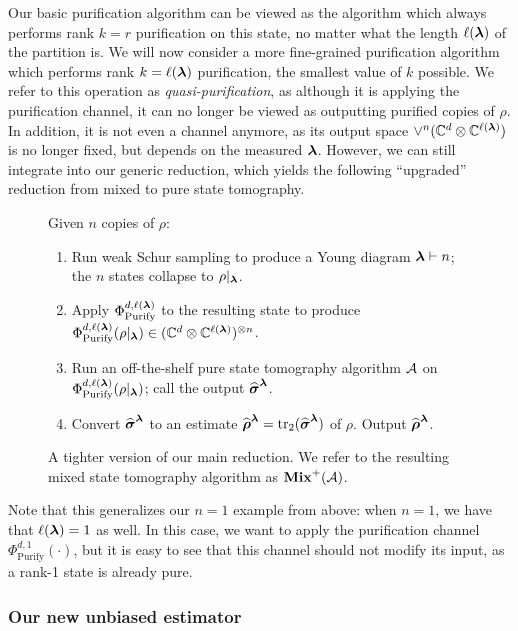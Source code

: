 \documentclass{article}
\newcommand{\mixed}{\textup{\textbf{Mix}}}
\newcommand{\purifychan}{\Phi_{\mathrm{Purify}}}
\begin{document}
Our basic purification algorithm  can be viewed as the algorithm which always performs rank $k = r$ purification on this state, no matter what the length $\ell(\boldsymbol{\lambda})$ of the partition is.
We will now consider 
a more fine-grained purification algorithm which performs rank $k = \ell(\boldsymbol{\lambda})$ purification, the smallest value of $k$ possible.
We refer to this operation as \emph{quasi-purification},
as although it is applying the purification channel,
it can no longer be viewed as outputting purified copies of $\rho$.
In addition, it is not even a channel anymore,
as its output space $\lor^n (\mathbb C^d \otimes \mathbb C^{\ell(\boldsymbol{\lambda})})$ 
is no longer fixed, but depends on the measured $\boldsymbol{\lambda}$.
However, we can still integrate into our generic reduction,
which yields the following ``upgraded'' reduction from mixed to pure state tomography.

{
\begin{figure}[H]
Given $n$ copies of $\rho$:
\begin{enumerate}
    \item Run weak Schur sampling to produce a Young diagram $\boldsymbol{\lambda} \vdash n$; the $n$ states collapse to $\rho|_{\boldsymbol{\lambda}}$. 
    \item Apply $\purifychan^{d, \ell(\blambda)}$ to the resulting state to produce $\purifychan^{d, \ell(\blambda)}(\rho|_{\blambda}) \in (\C^d \otimes \C^{\ell(\blambda)})^{\otimes n}$.
    \item Run an off-the-shelf pure state tomography algorithm $\mathcal{A}$ on $\purifychan^{d, \ell(\blambda)}(\rho|_{\blambda})$; call the output $\widehat{\boldsymbol{\sigma}}^{\boldsymbol{\lambda}}$.
    \item Convert $\widehat{\boldsymbol{\sigma}}^{\boldsymbol{\lambda}}$ to an estimate $\widehat{\boldsymbol{\rho}}^{\boldsymbol{\lambda}} = \tr_2(\widehat{\boldsymbol{\sigma}}^{\boldsymbol{\lambda}})$ of $\rho$. Output $\widehat{\boldsymbol{\rho}}^{\boldsymbol{\lambda}}$.
\end{enumerate}
\caption{A tighter version of our main reduction. We refer to the resulting mixed state tomography algorithm as $\mixed^+(\calA)$.}
\label{fig:reduction-llambda}
\end{figure}
}

\noindent
Note that this generalizes our $n = 1$ example from above: when $n = 1$, we have that $\ell(\boldsymbol{\lambda}) = 1$ as well.
In this case, we want to apply the purification channel $\purifychan^{d, 1}(\cdot)$, but it is easy to see that this channel should not modify its input,
as a rank-1 state is already pure.

\subsubsection{Our new unbiased estimator}
\label{sec:our-estimator}
\end{document}
